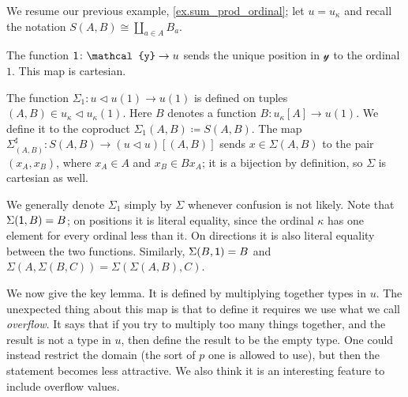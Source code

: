 \documentclass[11pt, one side, article]{memoir}
\theoremstyle{definition}
\theoremstyle{plain}
\newenvironment{example}
  {\pushQED{\qed}\renewcommand{\qedsymbol}{$\lozenge$}\examplex}
  {\popQED\endexamplex}
\newcommand{\yon}{\mathcal{y}}
\newcommand{\0}{\textsf{0}}
\newcommand{\1}{\tn{\textsf{1}}}
\newcommand{\tri}{\mathbin{\triangleleft}}
\begin{document}
\begin{example}
We resume our previous example, \cref{ex.sum_prod_ordinal}; let $u=u_\kappa$ and recall the notation $S(A,B)\cong\coprod_{a\in A}B_a$.

The function $\1\colon\yon\to u$ sends the unique position in $\yon$ to the ordinal $1$. This map is cartesian. 

The function $\Sigma_1\colon u\tri u(1)\to u(1)$ is defined on tuples $(A,B)\in u_\kappa\tri u_\kappa(1)$. Here $B$ denotes a function $B\colon u_\kappa[A]\to u(1)$. We define it to the coproduct $\Sigma_1(A,B)\coloneqq S(A,B)$. The map $\Sigma_{(A,B)}^\sharp\colon S(A,B)\to (u\tri u)[(A,B)]$ sends $x\in \Sigma(A,B)$ to the pair $(x_A,x_B)$, where $x_A\in A$ and $x_B\in B x_A$; it is a bijection by definition, so $\Sigma$ is cartesian as well.

We generally denote $\Sigma_1$ simply by $\Sigma$ whenever confusion is not likely. Note that $\Sigma(\1,B)=B$; on positions it is literal equality, since the ordinal $\kappa$ has one element for every ordinal less than it. On directions it is also literal equality between the two functions. Similarly, $\Sigma(B,\1)=B$ and $\Sigma(A,\Sigma(B,C))=\Sigma(\Sigma(A,B),C)$. 
\end{example}

We now give the key lemma. It is defined by multiplying together types in $u$. The unexpected thing about this map is that to define it requires we use what we call \emph{overflow}. It says that if you try to multiply too many things together, and the result is not a type in $u$, then define the result to be the empty type. One could instead restrict the domain (the sort of $p$ one is allowed to use), but then the statement becomes less attractive. We also think it is an interesting feature to include overflow values.
\end{document}
